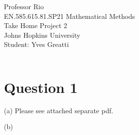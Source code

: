 \documentclass[12pt,twoside]{article}
\begin{document}
\noindent Professor Rio\\
EN.585.615.81.SP21 Mathematical Methods\\
Take Home Project 2\\
Johns Hopkins University\\
Student: Yves Greatti\\\

\section*{Question 1}

\be

\item [(a)]
Please see attached separate pdf.

\item [(b)]
\end{document}
